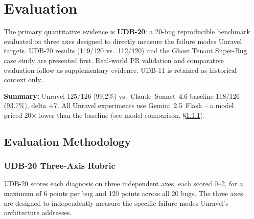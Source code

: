 \documentclass[12pt,a4paper]{article}
\begin{document}
\section{Evaluation}

The primary quantitative evidence is \textbf{UDB-20}: a 20-bug reproducible benchmark
evaluated on three axes designed to directly measure the failure modes Unravel targets.
UDB-20 results (119/120 vs.\ 112/120) and the Ghost Tenant Super-Bug case study
are presented first. Real-world PR validation and comparative evaluation follow as
supplementary evidence. UDB-11 is retained as historical context only.

\textbf{Summary:} Unravel 125/126 (99.2\%) vs.~Claude~Sonnet~4.6 baseline 118/126
(93.7\%), delta $+$7. All Unravel experiments use Gemini~2.5~Flash -- a model priced
20$\times$ lower than the baseline (see model comparison, \S\ref{sec:udb20}).

\subsection{Evaluation Methodology}

\subsubsection{UDB-20 Three-Axis Rubric}
\label{sec:udb20}

UDB-20 scores each diagnosis on three independent axes, each scored 0--2, for a maximum
of 6 points per bug and 120 points across all 20 bugs. The three axes are designed to
independently measure the specific failure modes Unravel's architecture addresses.
\end{document}
